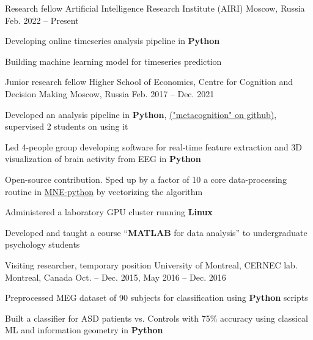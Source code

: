 
\begin{cventries}
  \cventry
    {Research fellow}
    {Artificial Intelligence Research Institute (AIRI)}
    {Moscow, Russia}
    {Feb. 2022 -- Present}
    {
      \begin{cvitems}
      \item Developing online timeseries analysis pipeline in \textbf{Python}
      \item Building machine learning model for timeseries prediction
      \end{cvitems}
    }
  \cventry
    {Junior research fellow}
    {Higher School of Economics, Centre for Cognition and Decision Making}
    {Moscow, Russia}
    {Feb. 2017 -- Dec. 2021}
    {
      \begin{cvitems}
      \item{Developed an analysis pipeline in \textbf{Python}, \href{https://github.com/dmalt/metacognition}{("metacognition" on github)}, supervised 2 students on using it
}
      \item{Led 4-people group developing software for real-time feature extraction and 3D visualization of brain activity from EEG in \textbf{Python}}
        \item{Open-source contribution. Sped up by a factor of 10 a core data-processing routine in \href{https://github.com/mne-tools/mne-python}{MNE-python} by vectorizing the algorithm}
        \item{Administered a laboratory GPU cluster running \textbf{Linux}}
      \item Developed and taught a course ``\textbf{MATLAB} for data analysis'' to undergraduate psychology students
      \end{cvitems}
    }
  \cventry
    {Visiting researcher, temporary position}
    {University of Montreal, CERNEC lab.}
    {Montreal, Canada}
    {Oct. -- Dec. 2015, May 2016 -- Dec. 2016}
    {
      \begin{cvitems}
      \item {Preprocessed MEG dataset of 90 subjects for classification using \textbf{Python} scripts}
      \item{Built a classifier for ASD patients vs. Controls with 75\% accuracy using classical ML and information geometry in \textbf{Python}}

\end{cvitems}}
\end{cventries}
